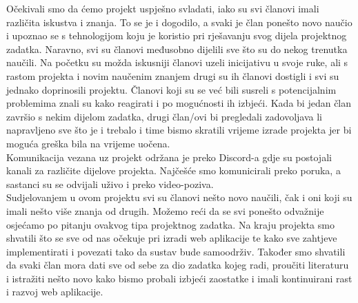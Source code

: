 		Očekivali smo da ćemo projekt uspješno svladati, iako su svi članovi imali različita iskustva i znanja. To se je i dogodilo, a svaki je član ponešto novo naučio i upoznao se s tehnologijom koju je koristio pri rješavanju svog dijela projektnog zadatka. Naravno, svi su članovi međusobno dijelili sve što su do nekog trenutka naučili. Na početku su možda iskusniji članovi uzeli inicijativu u svoje ruke, ali s rastom projekta i novim naučenim znanjem drugi su ih članovi dostigli i svi su jednako doprinosili projektu. Članovi koji su se već bili susreli s potencijalnim problemima znali su kako reagirati i po mogućnosti ih izbjeći. Kada bi jedan član završio s nekim dijelom zadatka, drugi član/ovi bi pregledali zadovoljava li napravljeno sve što je i trebalo i time bismo skratili vrijeme izrade projekta jer bi moguća greška bila na vrijeme uočena.\\
		Komunikacija vezana uz projekt održana je preko Discord-a gdje su postojali kanali za različite dijelove projekta. Najčešće smo komunicirali preko poruka, a sastanci su se odvijali uživo i preko video-poziva. \\
		Sudjelovanjem u ovom projektu svi su članovi nešto novo naučili, čak i oni koji su imali nešto više znanja od drugih. Možemo reći da se svi ponešto odvažnije osjećamo po pitanju ovakvog tipa projektnog zadatka. Na kraju projekta smo shvatili što se sve od nas očekuje pri izradi web aplikacije te kako sve zahtjeve implementirati i povezati tako da sustav bude samoodrživ. Također smo shvatili da svaki član mora dati sve od sebe za dio zadatka kojeg radi, proučiti literaturu i istražiti nešto novo kako bismo probali izbjeći zaostatke i imali kontinuirani rast i razvoj web aplikacije.
		
		\eject 